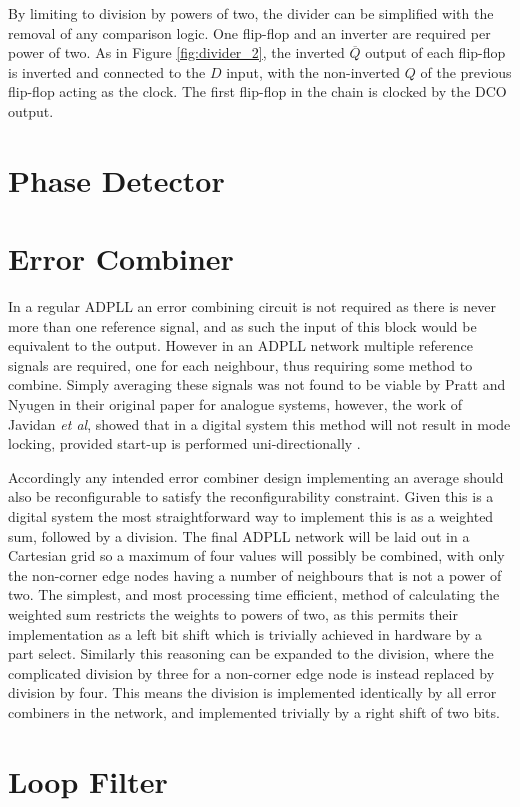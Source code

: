 By limiting to division by powers of two, the divider can be simplified with the removal of any comparison logic. One flip-flop and an inverter are required per power of two. As in Figure \ref{fig:divider_2}, the inverted $\overline{Q}$ output of each flip-flop is inverted and connected to the $D$ input, with the non-inverted $Q$ of the previous flip-flop acting as the clock. The first flip-flop in the chain is clocked by the \ac{DCO} output. 

\section{Phase Detector}

\section{Error Combiner}
In a regular \ac{ADPLL} an error combining circuit is not required as there is never more than one reference signal, and as such the input of this block would be equivalent to the output. However in an \ac{ADPLL} network multiple reference signals are required, one for each neighbour, thus requiring some method to combine. Simply averaging these signals was not found to be viable by Pratt and Nyugen in their original paper for analogue systems, however, the work of Javidan \textit{et al}, showed that in a digital system this method will not result in mode locking, provided start-up is performed uni-directionally \cite{javidan2011all}.

Accordingly any intended error combiner design implementing an average should also be reconfigurable to satisfy the reconfigurability constraint. Given this is a digital system the most straightforward way to implement this is as a weighted sum, followed by a division. The final \ac{ADPLL} network will be laid out in a Cartesian grid so a maximum of four values will possibly be combined, with only the non-corner edge nodes having a number of neighbours that is not a power of two.
The simplest, and most processing time efficient, method of calculating the weighted sum restricts the weights to powers of two, as this permits their implementation as a left bit shift which is trivially achieved in hardware by a part select.
Similarly this reasoning can be expanded to the division, where the complicated division by three for a non-corner edge node is instead replaced by division by four. This means the division is implemented identically by all error combiners in the network, and implemented trivially by a right shift of two bits.%

\section{Loop Filter}